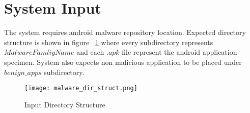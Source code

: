 
\section{System Input}
\label{System Input}
The system requires android malware repository location. Expected directory structure is shown in figure ~\ref{fig:malware_dir_struct} where every subdirectory represents \(Malware Famliy Name\) and each \(.apk\) file represent the android application specimen. System also expects non malicious application to be placed under \(benign\_apps\) subdirectory.

\begin{figure}[h]
\centering
\texttt{[image: malware\_dir\_struct.png]}
\caption{Input Directory Structure}
\label{fig:malware_dir_struct}
\end{figure}

